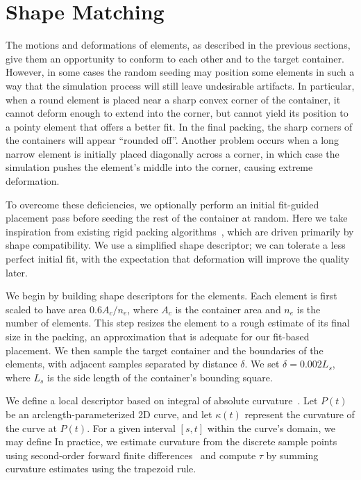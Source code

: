 \section{Shape Matching}
\label{repulsionpak_shape_matching}





The motions and deformations of elements, as described
in the previous sections, give them an opportunity to conform to each 
other and to the target container.  However, in some cases the random 
seeding may position some elements in such a way that the simulation 
process will still leave undesirable artifacts.  In particular, when
a round element is placed near a sharp convex corner of the container,
it cannot deform enough to extend into the corner, but cannot yield its
position to a pointy element that offers a better fit.  In the final
packing, the sharp corners of the containers will appear ``rounded off''.
Another problem occurs when a long narrow element is initially placed diagonally across a corner, 
in which case the simulation pushes the element's middle into the corner, causing extreme deformation.

To overcome these deficiencies, we optionally perform an initial fit-guided
placement pass before seeding the rest of the container at random. 
Here we take inspiration from existing rigid packing 
algorithms~\cite{Kwan2016}, which are driven primarily by shape 
compatibility.  We use a simplified shape descriptor; we can tolerate
a less perfect initial fit, with the expectation that deformation will
improve the quality later.

We begin by building shape descriptors for the elements.  
Each element is first scaled to have area
$0.6A_c/n_e$, where $A_c$ is the container area and $n_e$ is the 
number of elements.  This step resizes the element to a rough estimate
of its final size in the packing, an approximation that is adequate
for our fit-based placement.  We then sample the target container and
the boundaries of the elements, with adjacent samples separated by
distance $\delta$.  We set $\delta=0.002L_s$, where $L_s$ is the
side length of the container's bounding square.

We define a local descriptor based on integral of absolute curvature~\cite{Cui2009,Kwan2016}.
Let $P(t)$ be an arclength-parameterized 2D curve, and let $\kappa(t)$ represent the curvature of the curve at $P(t)$.  For a given interval $[s,t]$ within the curve's domain, we may define 
In practice, we estimate curvature from the discrete sample points
using second-order forward finite differences~\cite{Banchoff2015} 
and compute $\tau$ by summing curvature estimates using the trapezoid rule.

